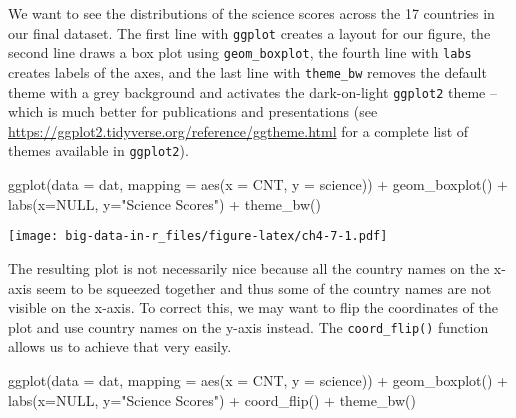 \documentclass[
]{book}
\newenvironment{Shaded}{\begin{snugshade}}{\end{snugshade}}
\newcommand{\AttributeTok}[1]{\textcolor[rgb]{0.77,0.63,0.00}{#1}}
\newcommand{\ConstantTok}[1]{\textcolor[rgb]{0.00,0.00,0.00}{#1}}
\newcommand{\FunctionTok}[1]{\textcolor[rgb]{0.00,0.00,0.00}{#1}}
\newcommand{\NormalTok}[1]{#1}
\newcommand{\SpecialCharTok}[1]{\textcolor[rgb]{0.00,0.00,0.00}{#1}}
\newcommand{\StringTok}[1]{\textcolor[rgb]{0.31,0.60,0.02}{#1}}
\begin{document}
We want to see the distributions of the science scores across the 17 countries in our final dataset. The first line with \texttt{ggplot} creates a layout for our figure, the second line draws a box plot using \texttt{geom\_boxplot}, the fourth line with \texttt{labs} creates labels of the axes, and the last line with \texttt{theme\_bw} removes the default theme with a grey background and activates the dark-on-light \texttt{ggplot2} theme -- which is much better for publications and presentations (see \url{https://ggplot2.tidyverse.org/reference/ggtheme.html} for a complete list of themes available in \texttt{ggplot2}).

\begin{Shaded}
\begin{Highlighting}[]
\FunctionTok{ggplot}\NormalTok{(}\AttributeTok{data =}\NormalTok{ dat, }\AttributeTok{mapping =} \FunctionTok{aes}\NormalTok{(}\AttributeTok{x =}\NormalTok{ CNT, }\AttributeTok{y =}\NormalTok{ science)) }\SpecialCharTok{+}
  \FunctionTok{geom\_boxplot}\NormalTok{() }\SpecialCharTok{+}
  \FunctionTok{labs}\NormalTok{(}\AttributeTok{x=}\ConstantTok{NULL}\NormalTok{, }\AttributeTok{y=}\StringTok{"Science Scores"}\NormalTok{) }\SpecialCharTok{+}
  \FunctionTok{theme\_bw}\NormalTok{()}
\end{Highlighting}
\end{Shaded}

\texttt{[image: big-data-in-r\_files/figure-latex/ch4-7-1.pdf]}

The resulting plot is not necessarily nice because all the country names on the x-axis seem to be squeezed together and thus some of the country names are not visible on the x-axis. To correct this, we may want to flip the coordinates of the plot and use country names on the y-axis instead. The \texttt{coord\_flip()} function allows us to achieve that very easily.

\begin{Shaded}
\begin{Highlighting}[]
\FunctionTok{ggplot}\NormalTok{(}\AttributeTok{data =}\NormalTok{ dat,}
       \AttributeTok{mapping =} \FunctionTok{aes}\NormalTok{(}\AttributeTok{x =}\NormalTok{ CNT, }\AttributeTok{y =}\NormalTok{ science)) }\SpecialCharTok{+}
  \FunctionTok{geom\_boxplot}\NormalTok{() }\SpecialCharTok{+}
  \FunctionTok{labs}\NormalTok{(}\AttributeTok{x=}\ConstantTok{NULL}\NormalTok{, }\AttributeTok{y=}\StringTok{"Science Scores"}\NormalTok{) }\SpecialCharTok{+}
  \FunctionTok{coord\_flip}\NormalTok{() }\SpecialCharTok{+}
  \FunctionTok{theme\_bw}\NormalTok{()}
\end{Highlighting}
\end{Shaded}
\end{document}
